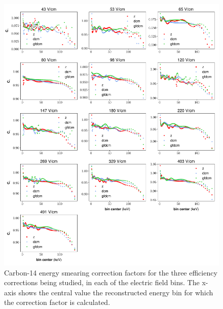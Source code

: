 \begin{figure}[h!]
\centering
\includegraphics[width=\textwidth]{Figures/C14_CE_prelim.pdf}
\caption{Carbon-14 energy smearing correction factors for the three efficiency corrections being studied, in each of the electric field bins. The x-axis shows the central value the reconstructed energy bin for which the correction factor is calculated.}
\label{fig:C14_CE_prelim}
\end{figure}
